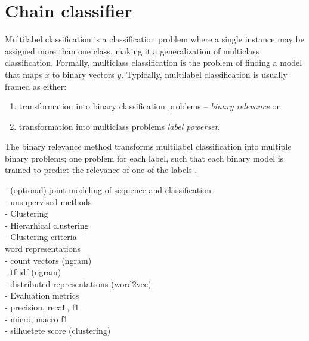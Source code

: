 \section{Chain classifier}

Multilabel classification is a classification problem where 
a single instance may be assigned more than one class, making it 
a generalization of multiclass classification.
Formally, multiclass classification is the problem of finding 
a model that maps $x$ to binary vectors $y$. Typically, 
multilabel classification is usually framed as either:
\begin{enumerate}
\item transformation into binary classification problems -- \textit{binary relevance} \citep{luaces2012binary} or
\item transformation into multiclass problems \textit{label powerset}.
\end{enumerate}
The binary relevance method transforms multilabel classification
into multiple binary problems; one problem for each label, such that each
binary model is trained to predict the relevance of one of the labels
\citep{read2011classifier}.





- (optional) joint modeling of sequence and classification \\


- unsupervised methods \\

- Clustering \\
- Hierarhical clustering \\
- Clustering criteria \\

word representations \\
- count vectors (ngram) \\
- tf-idf (ngram) \\
- distributed representations (word2vec) \\

- Evaluation metrics \\
- precision, recall, f1 \\
- micro, macro f1 \\
- silhuetete score (clustering) \\
